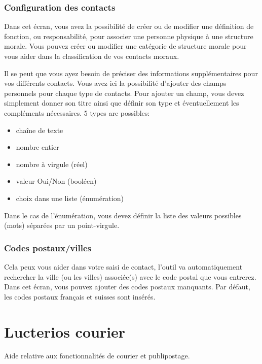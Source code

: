 \documentclass[a4paper,10pt,oneside,french]{sphinxmanual}
\begin{document}
\subsection{Configuration des contacts}
\label{\detokenize{contacts/configuration:configuration-des-contacts}}
Dans cet écran, vous avez la possibilité de créer ou de modifier une définition de fonction, ou responsabilité, pour associer une personne physique à une structure morale. Vous pouvez créer ou modifier une catégorie de structure morale pour vous aider dans la classification de vos contacts moraux.

Il se peut que vous ayez besoin de préciser des informations supplémentaires pour vos différents contacts. Vous avez ici la possibilité d’ajouter des champs personnels pour chaque type de contacts. Pour ajouter un champ, vous devez simplement donner son titre ainsi que définir son type et éventuellement les compléments nécessaires.
5 types are possibles:
\begin{itemize}
\item {} 
chaîne de texte

\item {} 
nombre entier

\item {} 
nombre à virgule (réel)

\item {} 
valeur Oui/Non (booléen)

\item {} 
choix dans une liste (énumération)

\end{itemize}

Dans le cas de l’énumération, vous devez définir la liste des valeurs possibles (mots) séparées par un point-virgule.


\subsection{Codes postaux/villes}
\label{\detokenize{contacts/configuration:codes-postaux-villes}}
Cela peux vous aider dans votre saisi de contact, l’outil va automatiquement rechercher la ville (ou les villes) associée(s) avec le code postal que vous entrerez.
Dans cet écran, vous pouvez ajouter des codes postaux manquants.
Par défaut, les codes postaux français et suisses sont insérés.


\chapter{Lucterios courier}
\label{\detokenize{mailing/index:lucterios-courier}}\label{\detokenize{mailing/index::doc}}
Aide relative aux fonctionnalités de courier et publipostage.
\end{document}
